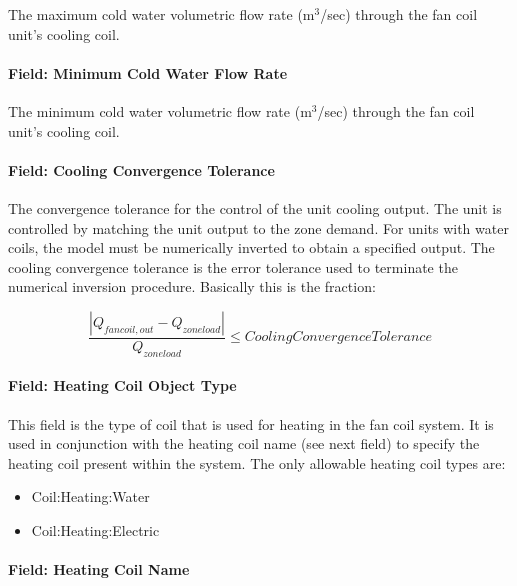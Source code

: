 The maximum cold water volumetric flow rate (m\(^{3}\)/sec) through the fan coil unit's cooling coil.

\paragraph{Field: Minimum Cold Water Flow Rate}\label{field-minimum-cold-water-flow-rate-000}

The minimum cold water volumetric flow rate (m\(^{3}\)/sec) through the fan coil unit's cooling coil.

\paragraph{Field: Cooling Convergence Tolerance}\label{field-cooling-convergence-tolerance-000}

The convergence tolerance for the control of the unit cooling output. The unit is controlled by matching the unit output to the zone demand. For units with water coils, the model must be numerically inverted to obtain a specified output. The cooling convergence tolerance is the error tolerance used to terminate the numerical inversion procedure. Basically this is the fraction:

\begin{equation}
\frac{{\left| {{Q_{fancoil,out}} - {Q_{zoneload}}} \right|}}{{{Q_{zoneload}}}} \le CoolingConvergenceTolerance
\end{equation}

\paragraph{Field: Heating Coil Object Type}\label{field-heating-coil-object-type-003}

This field is the type of coil that is used for heating in the fan coil system. It is used in conjunction with the heating coil name (see next field) to specify the heating coil present within the system. The only allowable heating coil types are:

\begin{itemize}
\item
  Coil:Heating:Water
\item
  Coil:Heating:Electric
\end{itemize}

\paragraph{Field: Heating Coil Name}\label{field-heating-coil-name-003}

